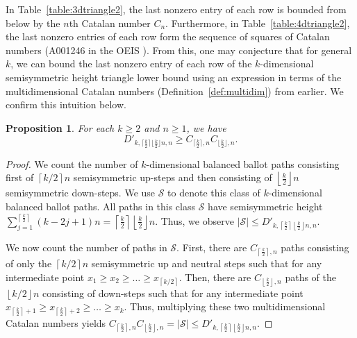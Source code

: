 \documentclass[11pt]{article}
\newtheorem{proposition}[theorem]{Proposition}
\theoremstyle{remark}
\theoremstyle{definition}
\begin{document}
In Table~\ref{table:3dtriangle2}, the last nonzero entry of each row is bounded from below by the $n$th Catalan number $C_n$. Furthermore, in Table~\ref{table:4dtriangle2}, the last nonzero entries of each row form the sequence of squares of Catalan numbers (A001246 in the OEIS \cite{oeis}). From this, one may conjecture that for general $k$, we can bound the last nonzero entry of each row of the $ k$-dimensional semisymmetric height triangle lower bound using an expression in terms of the multidimensional Catalan numbers (Definition~\ref{def:multidim}) from earlier. We confirm this intuition below.
\begin{proposition}\label{prop:Bound}
    For each $k \geq 2$ and $n \geq 1$, we have \[D'_{k, \lceil \frac{k}{2}\rceil \lfloor \frac{k}{2}\rfloor n, n} \geq {C}_{\lceil \frac{k}{2}\rceil, n}{C}_{\lfloor \frac{k}{2}\rfloor, n}.\]
\end{proposition}
\begin{proof}
    We count the number of $k$-dimensional balanced ballot paths consisting first of $\left\lceil k/2 \right\rceil n$ semisymmetric up-steps and then consisting of $\left\lfloor \frac{k}{2} \right\rfloor n$ semisymmetric down-steps. We use $\mathcal{S}$ to denote this class of $k$-dimensional balanced ballot paths. All paths in this class $\mathcal{S}$ have semisymmetric height $\sum_{j=1}^{\left\lceil \frac{k}{2} \right\rceil}(k-2j+1)n = \left\lceil \frac{k}{2}\right\rceil \left\lfloor \frac{k}{2} \right\rfloor n$.  Thus, we observe $|\mathcal{S}| \leq D'_{k, \left\lceil \frac{k}{2}\right\rceil \left\lfloor \frac{k}{2}\right\rfloor n, n} $.

    We now count the number of paths in $\mathcal{S}$. First, there are ${C}_{\left\lceil \frac{k}{2}\right\rceil, n}$ paths consisting of only the $\left\lceil k/2 \right\rceil n$ semisymmetric up and neutral steps such that for any intermediate point $x_1 \geq x_2 \geq \dots \geq x_{\left\lceil k/2 \right\rceil}$. Then, there are $C_{\left\lfloor \frac{k}{2}\right\rfloor, n}$ paths of the $\left\lfloor k/2 \right\rfloor n$ consisting of down-steps such that for any intermediate point $x_{\left\lceil \frac{k}{2}\right\rceil+1} \geq x_{\left\lceil \frac{k}{2}\right\rceil+2}  \geq \dots \geq x_{k}$. Thus, multiplying these two multidimensional Catalan numbers yields ${C}_{\left\lceil \frac{k}{2}\right\rceil, n}{C}_{\left\lfloor \frac{k}{2}\right\rfloor, n}  = |\mathcal{S}| \leq D'_{k, \left\lceil \frac{k}{2}\right\rceil \left\lfloor \frac{k}{2}\right\rfloor n, n}$.
\end{proof}
\end{document}
